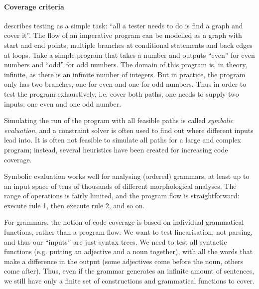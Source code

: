 \paragraph{Coverage criteria}

\citet{beizer2003software} describes testing as a
simple task: ``all a tester needs to do is find a graph and cover
it''. The flow of an imperative program can be modelled as a graph
with start and end points; multiple branches at conditional statements
and back edges at loops. Take a simple program that takes a number and
outputs ``even'' for even numbers and ``odd'' for odd numbers. The domain of this program is, in theory, infinite, as there is an infinite number of integers. But in practice, the program only has two branches, one for even and one for odd numbers. Thus in order to test the program exhaustively, i.e. cover both paths, one needs to supply two inputs: one even and one odd number.

Simulating the run of the program with all feasible paths is called
\emph{symbolic evaluation}, and a constraint solver is often used to
find out where different inputs lead into. It is often not feasible to
simulate all paths for a large and complex program; instead, several
heuristics have been created for increasing code coverage.

Symbolic evaluation works well for analysing (ordered) \onlycg{} grammars, at
least up to an input space of tens of thousands of different
morphological analyses. The range of operations is fairly limited, and
the program flow is straightforward: execute rule 1, then execute
rule 2, and so on.

For \gf{} grammars, the notion of code coverage is based on individual
grammatical functions, rather than a program flow. We want to test
linearisation, not parsing, and thus our ``inputs'' are just syntax
trees.  We need to test all syntactic functions (e.g. putting an
adjective and a noun together), with all the words that make a
difference in the output (some adjectives come before the noun, others
come after). Thus, even if the grammar generates an infinite amount of
sentences, we still have only a finite set of constructions and
grammatical functions to cover.



